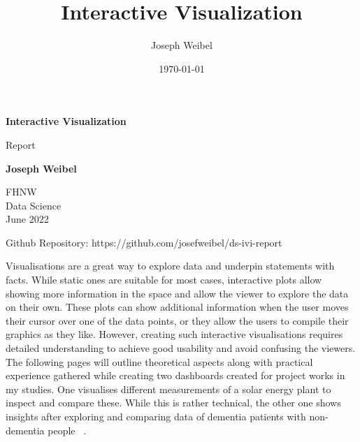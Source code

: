 \documentclass[11pt]{article}
\title{Interactive Visualization}
\author{Joseph Weibel}
\date{\today}
\begin{document}
\begin{titlepage}
    \begin{center}
        \vspace*{0.4cm}

        \Huge
        \textbf{Interactive Visualization}

        \vspace{0.3cm}
        \LARGE
        Report

        \vspace{0.8cm}

        \textbf{Joseph Weibel}

        \vfill


        \vfill

        \vspace{0.3cm}

        \Large
        FHNW\\
        Data Science\\
        June 2022

        \vspace{1.0cm}

        \normalsize
        Github Repository: https://github.com/josefweibel/ds-ivi-report

        \vspace{0.8cm}

    \end{center}
\end{titlepage}
\pagebreak

\tableofcontents
\pagebreak

Visualisations are a great way to explore data and underpin statements with facts. While static ones are suitable for most cases, interactive plots allow showing more information in the space and allow the viewer to explore the data on their own. These plots can show additional information when the user moves their cursor over one of the data points, or they allow the users to compile their graphics as they like. However, creating such interactive visualisations requires detailed understanding to achieve good usability and avoid confusing the viewers. The following pages will outline theoretical aspects along with practical experience gathered while creating two dashboards created for project works in my studies. One visualises different measurements of a solar energy plant to inspect and compare these. While this is rather technical, the other one shows insights after exploring and comparing data of dementia patients with non-dementia people ~\parencite{alzheimers_disease_neuroimaging_initiative_adni_2022}.
\end{document}
